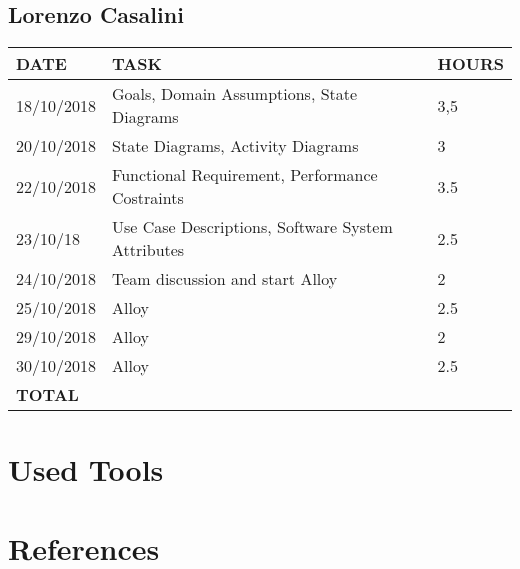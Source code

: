\documentclass[12pt]{article}
\begin{document}
\subsection{Lorenzo Casalini}

\begin{center}
\begin{tabular}{ |p{}|p{}|p{}| } 
 \hline
 \textbf{DATE} & \textbf{TASK} & \textbf{HOURS} \\ 
  \hline
  18/10/2018 & Goals, Domain Assumptions, State Diagrams & 3,5\\ 
  \hline 
  20/10/2018 & State Diagrams, Activity Diagrams & 3 \\
  \hline
  22/10/2018 & Functional Requirement, Performance Costraints & 3.5 \\
  \hline
  23/10/18 & Use Case Descriptions, Software System Attributes & 2.5 \\
  \hline
  24/10/2018 & Team discussion and start Alloy & 2 \\ 
  \hline
  25/10/2018 & Alloy & 2.5 \\ 
  \hline
  29/10/2018 & Alloy & 2 \\ 
  \hline 
  30/10/2018 & Alloy & 2.5\\
  \hline
  \textbf{TOTAL} & \multicolumn{2}{c|}{} \\ 
  \hline
\end{tabular}
\end{center}

\section{Used Tools}

\section{References}
\end{document}
